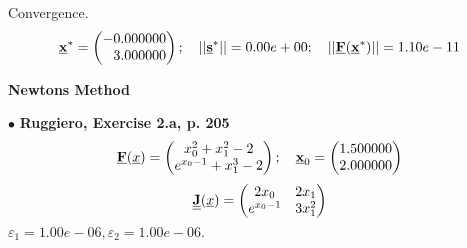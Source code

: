 \documentclass{report}[10pts]
\begin{document}
Convergence.
\[
   \Vector{x}^*=
      \begin{pmatrix*}[r]
      -0.000000 \\ 3.000000
      \end{pmatrix*}
   ;\quad
   ||\Vector{s}^*||=
   0.00e+00
   ;\quad
   ||\Vector{F}(\Vector{x}^*)||=
   1.10e-11
\]
\clearpage


   \begin{center}
   \textbf{\Large{Newtons Method}}
   \end{center}
$\bullet$
\textbf{Ruggiero, Exercise 2.a, p. 205}
\[
   \Vector{F}(\underline{x})=
      \begin{pmatrix*}
      x_0^2+x_1^2-2 \\ e^{x_0-1}+x_1^3-2
      \end{pmatrix*}
   ;\quad
   \Vector{x}_0=
      \begin{pmatrix*}[r]
      1.500000 \\ 2.000000
      \end{pmatrix*}
\]
\[
   \Matrix{J}(\underline{x})=
      \begin{pmatrix*}
         2x_0 & 2x_1\\
         e^{x_0-1} & 3x_1^2\\
      \end{pmatrix*}
\]
$
\varepsilon_1=1.00e-06,
\varepsilon_2=1.00e-06.
$
\end{document}
